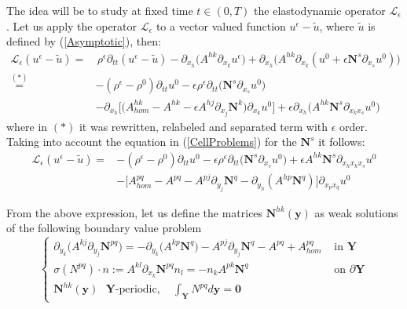 The idea will be to study at fixed time $t \in (0,T)$ the elastodynamic operator $\mathcal{L}_{\epsilon}$.
Let us apply the operator $\mathcal{L}_{\epsilon}$ to a vector valued function $u^{\epsilon}-\tilde{u}$, where $\tilde{u}$ is defined by (\ref{Asymptotic}), then:
\begin{align*}
    \mathcal{L}_{\epsilon} (u^{\epsilon}-\tilde{u}) =&\, \rho^{\epsilon} \partial_{tt} (u^{\epsilon}-\tilde{u}) - \partial_{x_h} \big( A^{hk}\partial_{x_k} u^{\epsilon} \big) + \partial_{x_h} \big( A^{hk}\partial_{x_k} (u^0 + \epsilon \mathbf{N}^s \partial_{x_s}u^0 )\big) \\
    \overset{(*)}{=}& - (\rho^{\epsilon}-\rho^0) \partial_{tt} u^0 - \epsilon \rho^{\epsilon} \partial_{tt}\big(\mathbf{N}^s \partial_{x_s}u^0 \big)  \\
    & - \partial_{x_h} \big[ \big( A_{hom}^{hk} - A^{hk} - \epsilon A^{hj}\partial_{x_j} \mathbf{N}^k \big) \partial_{x_k} u^0 \big] + \epsilon \partial_{x_h} \big( A^{hk} \mathbf{N}^s \partial_{x_k x_s} u^0 \big) 
\end{align*}
where in $(*)$ it was rewritten, relabeled and separated term with $\epsilon$ order.
Taking into account the equation in (\ref{CellProblems}) for the $\mathbf{N}^s$ it follows:
\begin{align*}
    \mathcal{L}_{\epsilon} (u^{\epsilon} - \tilde{u})  =& - (\rho^{\epsilon}-\rho^0) \partial_{tt} u^0 - \epsilon \rho^{\epsilon} \partial_{tt}\big(\mathbf{N}^s \partial_{x_s}u^0 \big) + \epsilon A^{hk}\mathbf{N}^s \partial_{x_h x_k x_s}u^0 \\
    & - \big[ A^{pq}_{hom} - A^{pq} - A^{pj} \partial_{y_j} \mathbf{N}^q - \partial_{y_h}(A^{hp} \mathbf{N}^q) \big] \partial_{x_p x_q} u^0 
    \end{align*}

From the above expression, let us define the matrices $\mathbf{N}^{hk}(\mathbf{y})$ as weak solutions of the following boundary value problem
\begin{equation}
    \label{SecondCellProblem}
    \left \{
    \begin{array}{cc}
        \partial_{y_k} \big( A^{kj}\partial_{y_j} \mathbf{N}^{pq}\big) = -\partial_{y_k} \big( A^{kp} \mathbf{N}^q\big) - A^{pj}\partial_{y_j} \mathbf{N}^q - A^{pq} + A^{pq}_{hom} & \text{ in } \mathbf{Y}\\
        \sigma(N^{pq})\cdot n := A^{kl}\partial_{x_k}\mathbf{N}^{pq}n_l = - n_k A^{pk}\mathbf{N}^q & \text{ on } \partial \mathbf{Y} \\
        \mathbf{N}^{hk}(\mathbf{y}) \text{ $\mathbf{Y}$-periodic}, \quad  \int_{\mathbf{Y}} N^{pq} d \mathbf{y} = \mathbf{0} &
    \end{array}
    \right .
\end{equation}

